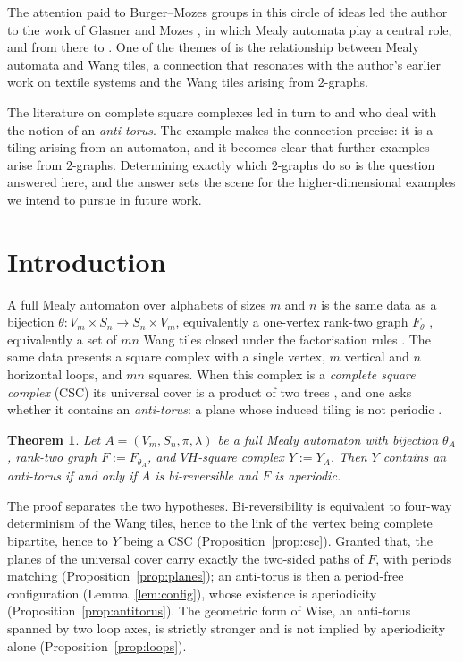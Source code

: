 \documentclass[11pt,reqno]{amsart}
\theoremstyle{plain}
\newtheorem{theorem}{Theorem}[section]
\theoremstyle{definition}
\newcommand{\Vm}{V_m}
\newcommand{\Sn}{S_n}
\begin{document}
The attention paid to Burger--Mozes groups \cite{BM1,BM2} in this circle of ideas
led the author to the work of Glasner and Mozes \cite{GM}, in which Mealy automata
play a central role, and from there to \cite{KlPi}. One of the themes of \cite{KlPi}
is the relationship between Mealy automata and Wang tiles, a connection that
resonates with the author's earlier work on textile systems and the Wang tiles
arising from $2$-graphs.

The literature on complete square complexes led in turn to \cite{W} and \cite{Rat} who deal with the
notion of an \emph{anti-torus}. The example \cite[Example~4.1]{W} makes the
connection precise: it is a tiling arising from an automaton, and it becomes clear
that further examples arise from $2$-graphs. Determining exactly which $2$-graphs do
so is the question answered here, and the answer sets the scene for the
higher-dimensional examples we intend to pursue in future work.

\section{Introduction}

A full Mealy automaton over alphabets of sizes $m$ and $n$ is the same data as a
bijection $\theta\colon V_m\times S_n\to S_n\times V_m$, equivalently a one-vertex
rank-two graph $F_\theta$ \cite{KP,Y}, equivalently a set of $mn$ Wang tiles closed
under the factorisation rules \cite{HRSW,RSY}. The same data presents a square
complex with a single vertex, $m$ vertical and $n$ horizontal loops, and $mn$
squares. When this complex is a \emph{complete square complex} (CSC) its universal
cover is a product of two trees \cite{W,GM}, and one asks whether it contains an
\emph{anti-torus}: a plane whose induced tiling is not periodic \cite[\S5]{W}.

\begin{theorem}\label{thm:main}
Let $A=(\Vm,\Sn,\pi,\lambda)$ be a full Mealy automaton with bijection $\theta_A$,
rank-two graph $F:=F_{\theta_A}$, and $VH$-square complex $Y:=Y_A$. Then $Y$
contains an anti-torus if and only if $A$ is bi-reversible and $F$ is aperiodic.
\end{theorem}

The proof separates the two hypotheses. Bi-reversibility is equivalent to four-way
determinism of the Wang tiles, hence to the link of the vertex being complete
bipartite, hence to $Y$ being a CSC (Proposition~\ref{prop:csc}). Granted that,
the planes of the universal cover carry exactly the two-sided paths of $F$, with
periods matching (Proposition~\ref{prop:planes}); an anti-torus is then a
period-free configuration (Lemma~\ref{lem:config}), whose existence is aperiodicity
(Proposition~\ref{prop:antitorus}). The geometric form of Wise, an anti-torus
spanned by two loop axes, is strictly stronger and is not implied by aperiodicity
alone (Proposition~\ref{prop:loops}).
\end{document}
